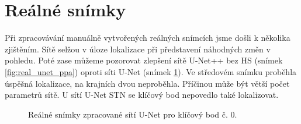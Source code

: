 \section{Reálné snímky}
\label{sec:Chapter64}
Při zpracovávání manuálně vytvořených reálných snímcích jsme došli k několika zjištěním. Sítě selžou v úloze lokalizace při představení náhodných změn v pohledu. Poté zase můžeme pozorovat zlepšení sítě U-Net++ bez HS (snímek \ref{fig:real_unet_ppa}) oproti síti U-Net (snímek \ref{fig:real_unet_a}). Ve středovém snímku proběhla úspěšná lokalizace, na krajních dvou neproběhla. Příčinou může být větší počet parametrů sítě. U sítí U-Net STN se klíčový bod nepovedlo také lokalizovat.
\begin{figure}[H]
\centering

\newcommand{\subfiguresize}{.15\textwidth}
\newcommand{\imagewidth}{1.0in}
\newcommand{\hspacesize}{.00in}

\newcommand{\insertimage}[1]{%
  \begin{minipage}{\imagewidth}
    \centering
    \texttt{[image: \#1]}
  \end{minipage}
}

\hspace{\hspacesize}%
\hspace{\hspacesize}%
\caption[Reálné snímky zpracované sítí U-Net]
{Reálné snímky zpracované sítí U-Net pro klíčový bod č. 0. }
\label{fig:real_unet_a}
\end{figure}


